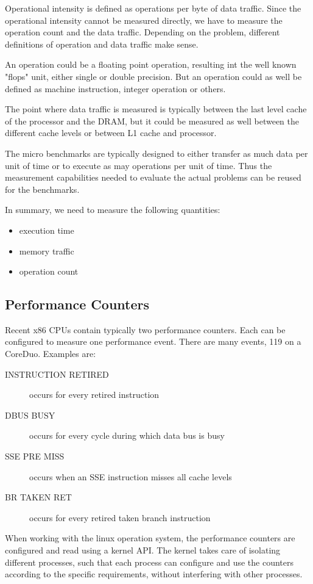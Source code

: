 \documentclass[a4paper,12pt]{article}
\begin{document}
Operational intensity is defined as operations per byte of data traffic. Since
the operational intensity cannot be measured directly, we have to measure the
operation count and the data traffic. Depending on the problem, different
definitions of operation and data traffic make sense.

An operation could be a floating point operation, resulting int the well known
"flops" unit, either single or double precision. But an operation could as well
be defined as machine instruction, integer operation or others.

The point where data traffic is measured is typically between the last level
cache of the processor and the DRAM, but it could be measured as well between
the different cache levels or between L1 cache and processor.

The micro benchmarks are typically designed to either transfer as much data per
unit of time or to execute as may operations per unit of time. Thus the
measurement capabilities needed to evaluate the actual problems can be reused
for the benchmarks. 

In summary, we need to measure the following quantities:
\begin{itemize}
\item execution time
\item memory traffic
\item operation count
\end{itemize}

\subsection{Performance Counters}
Recent x86 CPUs contain typically two performance counters. Each can be
configured to measure one performance event. There are many events, 119 on a
CoreDuo. Examples are:
\begin{description}
  \item[INSTRUCTION RETIRED] occurs for every retired instruction
  \item[DBUS BUSY] occurs for every cycle during which data bus is busy
  \item[SSE PRE MISS] occurs when an SSE instruction misses all cache levels
  \item[BR TAKEN RET] occurs for every retired taken branch instruction 
\end{description}

When working with the linux operation system, the performance counters are
configured and read using a kernel API. The kernel takes care of isolating
different processes, such that each process can configure and use the counters
according to the specific requirements, without interfering with other processes.
\end{document}

